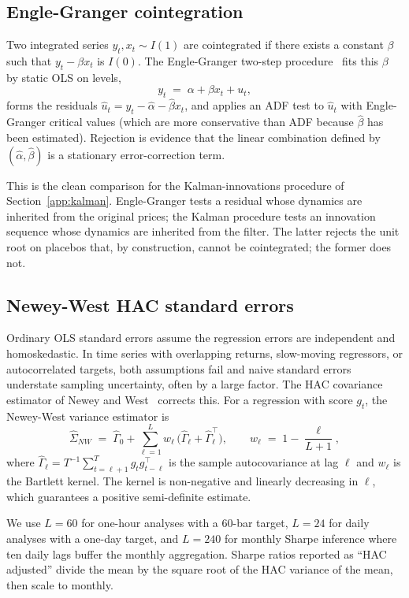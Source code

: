 \documentclass[11pt]{article}
\begin{document}
\subsection{Engle-Granger cointegration}
\label{app:eg}

Two integrated series $y_t, x_t \sim I(1)$ are cointegrated if there exists a constant
$\beta$ such that $y_t - \beta x_t$ is $I(0)$. The Engle-Granger two-step
procedure~\cite{engle1987cointegration} fits this $\beta$ by static OLS on levels,
\[
y_t \;=\; \alpha + \beta x_t + u_t,
\]
forms the residuals $\hat{u}_t = y_t - \hat\alpha - \hat\beta x_t$, and applies an ADF test
to $\hat{u}_t$ with Engle-Granger critical values (which are more conservative than ADF
because $\hat\beta$ has been estimated). Rejection is evidence that the linear combination
defined by $(\hat\alpha, \hat\beta)$ is a stationary error-correction term.

This is the clean comparison for the Kalman-innovations procedure of
Section~\ref{app:kalman}. Engle-Granger tests a residual whose dynamics are inherited from
the original prices; the Kalman procedure tests an innovation sequence whose dynamics are
inherited from the filter. The latter rejects the unit root on placebos that, by
construction, cannot be cointegrated; the former does not.

\subsection{Newey-West HAC standard errors}
\label{app:hac}

Ordinary OLS standard errors assume the regression errors are independent and
homoskedastic. In time series with overlapping returns, slow-moving regressors, or
autocorrelated targets, both assumptions fail and naive standard errors understate sampling
uncertainty, often by a large factor. The HAC covariance estimator of
Newey and West~\cite{newey1987hac} corrects this. For a regression with score $g_t$, the
Newey-West variance estimator is
\[
\hat{\Sigma}_{NW} \;=\; \hat{\Gamma}_0 + \sum_{\ell = 1}^{L} w_\ell \, \big( \hat{\Gamma}_\ell + \hat{\Gamma}_\ell^\top \big),
\qquad
w_\ell \;=\; 1 - \frac{\ell}{L+1},
\]
where $\hat{\Gamma}_\ell = T^{-1} \sum_{t = \ell+1}^{T} g_t g_{t-\ell}^\top$ is the sample
autocovariance at lag $\ell$ and $w_\ell$ is the Bartlett kernel. The kernel is
non-negative and linearly decreasing in $\ell$, which guarantees a positive semi-definite
estimate.

We use $L = 60$ for one-hour analyses with a 60-bar target, $L = 24$ for daily analyses
with a one-day target, and $L = 240$ for monthly Sharpe inference where ten daily lags
buffer the monthly aggregation. Sharpe ratios reported as ``HAC adjusted'' divide the mean
by the square root of the HAC variance of the mean, then scale to monthly.
\end{document}
